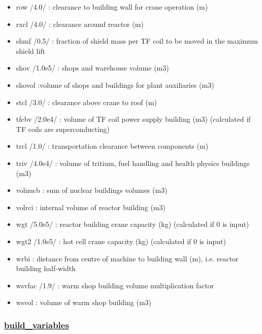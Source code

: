 \documentclass[]{article}
\begin{document}
\begin{itemize}
\item
  row /4.0/ : clearance to building wall for crane operation (m)
\item
  rxcl /4.0/ : clearance around reactor (m)
\item
  shmf /0.5/ : fraction of shield mass per TF coil to be moved in the
  maximum shield lift
\item
  shov /1.0e5/ : shops and warehouse volume (m3)
\item
  shovol :volume of shops and buildings for plant auxiliaries (m3)
\item
  stcl /3.0/ : clearance above crane to roof (m)
\item
  tfcbv /2.0e4/ : volume of TF coil power supply building (m3)
  (calculated if TF coils are superconducting)
\item
  trcl /1.0/ : transportation clearance between components (m)
\item
  triv /4.0e4/ : volume of tritium, fuel handling and health physics
  buildings (m3)
\item
  volnucb : sum of nuclear buildings volumes (m3)
\item
  volrci : internal volume of reactor building (m3)
\item
  wgt /5.0e5/ : reactor building crane capacity (kg) (calculated if 0 is
  input)
\item
  wgt2 /1.0e5/ : hot cell crane capacity (kg) (calculated if 0 is input)
\item
  wrbi : distance from centre of machine to building wall (m), i.e.
  reactor building half-width
\item
  wsvfac /1.9/ : warm shop building volume multiplication factor
\item
  wsvol : volume of warm shop building (m3)
\end{itemize}

\hypertarget{build_variables}{%
\subsubsection{\texorpdfstring{\href{build_variables.html}{build\_variables}}{build\_variables}}\label{build_variables}}
\end{document}
